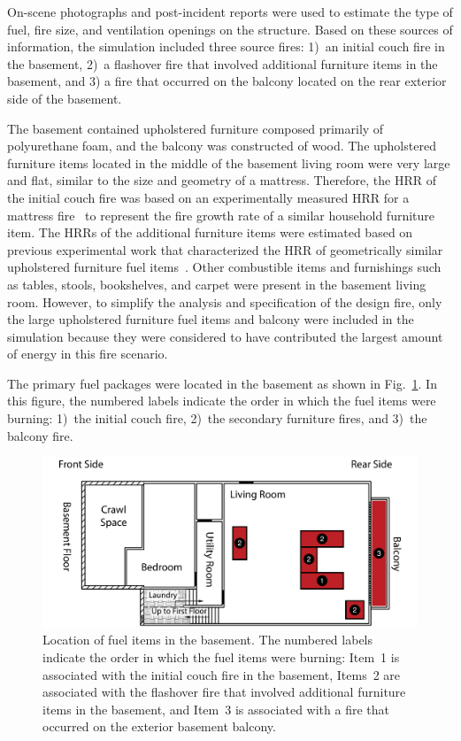 \documentclass[12pt,oneside]{book}
\begin{document}
On-scene photographs and post-incident reports were used to estimate the type of fuel, fire size, and ventilation openings on the structure. Based on these sources of information, the simulation included three source fires: 1)~an initial couch fire in the basement, 2)~a flashover fire that involved additional furniture items in the basement, and 3) a fire that occurred on the balcony located on the rear exterior side of the basement.

The basement contained upholstered furniture composed primarily of polyurethane foam, and the balcony was constructed of wood. The upholstered furniture items located in the middle of the basement living room were very large and flat, similar to the size and geometry of a mattress. Therefore, the HRR of the initial couch fire was based on an experimentally measured HRR for a mattress fire~\cite{madrzykowski2009fire} to represent the fire growth rate of a similar household furniture item. The HRRs of the additional furniture items were estimated based on previous experimental work that characterized the HRR of geometrically similar upholstered furniture fuel items~\cite{madrzykowski2009fire,Madrzykowski:2,Babrauskas:1}. Other combustible items and furnishings such as tables, stools, bookshelves, and carpet were present in the basement living room. However, to simplify the analysis and specification of the design fire, only the large upholstered furniture fuel items and balcony were included in the simulation because they were considered to have contributed the largest amount of energy in this fire scenario.

The primary fuel packages were located in the basement as shown in Fig.~\ref{fig:fuel_placement}. In this figure, the numbered labels indicate the order in which the fuel items were burning: 1)~the initial couch fire, 2)~the secondary furniture fires, and 3)~the balcony fire.

\begin{figure}[!ht]
\includegraphics[width=5.5in]{../Figures/Plan_Basement_Fuels}
\caption[Location of fuel items in the basement.]
{Location of fuel items in the basement. The numbered labels indicate the order in which the fuel items were burning: Item~1 is associated with the initial couch fire in the basement, Items~2 are associated with the flashover fire that involved additional furniture items in the basement, and Item~3 is associated with a fire that occurred on the exterior basement balcony.}
\label{fig:fuel_placement}
\end{figure}
\end{document}
